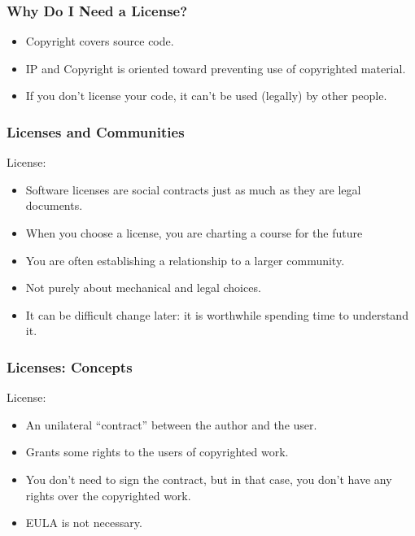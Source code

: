 
\begin{frame}
\frametitle{Why Do I Need a License?}

\begin{itemize}
\item Copyright covers source code.
\item IP and Copyright is oriented toward preventing use of copyrighted material.
\item If you don't license your code, it can't be used (legally) by other people.
\end{itemize}

\end{frame}




\begin{frame}
\frametitle{Licenses and Communities}

License:
\begin{itemize}
\item Software licenses are social contracts just as much as they are legal documents.
\item When you choose a license, you are charting a course for the future
\item You are often establishing a relationship to a larger community.
\item Not purely about mechanical and legal choices.
\item It can be difficult change later: it is worthwhile spending time to understand it.
\end{itemize}

\end{frame}


\begin{frame}
\frametitle{Licenses: Concepts}

License:
\begin{itemize}
\item An unilateral ``contract'' between the author and the user.
\item Grants some rights to the users of copyrighted work.
\item You don't need to sign the contract, but in that case, you don't have
any rights over the copyrighted work. 
\item EULA is not necessary.
\end{itemize}

\end{frame}


